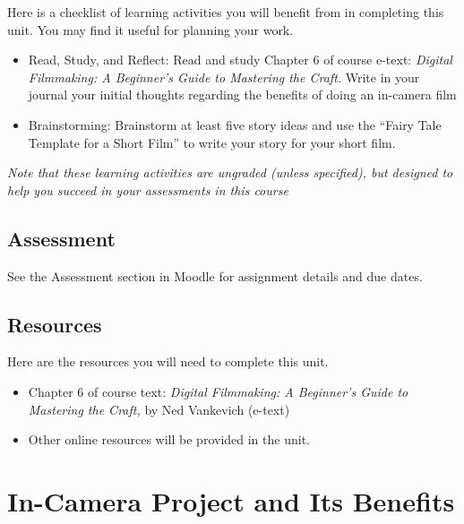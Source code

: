 \documentclass[
]{book}
\providecommand{\tightlist}{%
  \setlength{\itemsep}{0pt}\setlength{\parskip}{0pt}}
\begin{document}
\begin{reflect}
Here is a checklist of learning activities you will benefit from in completing this unit. You may find it useful for planning your work.

\begin{itemize}
\tightlist
\item
  Read, Study, and Reflect: Read and study Chapter 6 of course e-text: \emph{Digital Filmmaking: A Beginner's Guide to Mastering the Craft.} Write in your journal your initial thoughts regarding the benefits of doing an in-camera film
\item
  Brainstorming: Brainstorm at least five story ideas and use the ``Fairy Tale Template for a Short Film'' to write your story for your short film.
\end{itemize}

\emph{Note that these learning activities are ungraded (unless specified), but designed to help you succeed in your assessments in this course}
\end{reflect}

\hypertarget{assessment-9}{%
\subsection*{Assessment}\label{assessment-9}}

See the Assessment section in Moodle for assignment details and due dates.

\hypertarget{resources-5}{%
\subsection*{Resources}\label{resources-5}}

Here are the resources you will need to complete this unit.

\begin{itemize}
\tightlist
\item
  Chapter 6 of course text: \emph{Digital Filmmaking: A Beginner's Guide to Mastering the Craft,} by Ned Vankevich (e-text)
\item
  Other online resources will be provided in the unit.
\end{itemize}

\hypertarget{in-camera-project-and-its-benefits}{%
\section{In-Camera Project and Its Benefits}\label{in-camera-project-and-its-benefits}}
\end{document}
